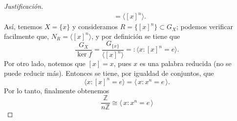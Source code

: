 \begin{proof}[Justificación]
\begin{align*}
		&= \langle [x]^n \rangle.
	\end{align*} 
	Así, tenemos \( X = \{x\} \) y consideramos \( R = \{[x]^n\} \subset G_X \); podemos verificar facilmente que, \( N_R = \langle [x]^n\rangle\), y por definición se tiene que  
	\[
	\dfrac{G_{X}}{\ker f} = \dfrac{G_{\{x\}}}{\langle [x]^n \rangle} =: \langle x : [x]^n = e \rangle.
	\] 	Por otro lado, notemos que \( [x] = x \), pues \( x \) es una palabra reducida (no se puede reducir más). Entonces se tiene, por igualdad de conjuntos, que 
	\[
	\langle x : [x]^n = e \rangle = \langle\, x : x^n = e\, \rangle.
	\] 	Por lo tanto, finalmente obtenemos
	\[
	\dfrac{\mathbb{Z}}{n\mathbb{Z}} \cong \langle \,x : x^n = e \,\rangle
	\]
\end{proof}




\begin{ejemplo}
\end{ejemplo}

